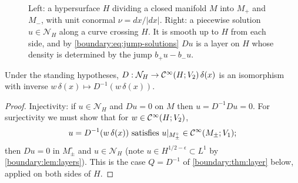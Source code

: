 \begin{figure}[ht]
  \centering
  \caption{Left: a hypersurface $H$ dividing a closed manifold $M$ into $M_+$ and
  $M_-$, with unit conormal $\nu=dx/|dx|$. Right: a piecewise solution
  $u\in\mathcal N_H$ along a curve crossing $H$. It is smooth up to $H$ from each
  side, and by \eqref{boundary:eq:jump-solutions} $Du$ is a layer on $H$ whose
  density is determined by the jump $b_+u-b_-u$.}
  \label{boundary:fig:dividing}
\end{figure}

\begin{proposition}\label{boundary:prop:layer-iso}
Under the standing hypotheses, $D:\mathcal{N}_H\to\mathcal{C}^\infty(H;V_2)\,\delta(x)$ is an
isomorphism with inverse $w\,\delta(x)\mapsto D^{-1}(w\,\delta(x))$.
\end{proposition}
\begin{proof}
Injectivity: if $u\in\mathcal{N}_H$ and $Du=0$ on $M$ then $u=D^{-1}Du=0$. For
surjectivity we must show that for $w\in\mathcal{C}^\infty(H;V_2)$,
\begin{equation}\label{boundary:eq:layer-smooth}
u=D^{-1}(w\,\delta(x))\ \text{satisfies}\ u|_{M_\pm^\circ}\in\CI(M_\pm;V_1);
\end{equation}
then $Du=0$ in $M_\pm^\circ$ and $u\in\mathcal{N}_H$ (note $u\in H^{1/2-\epsilon}
\subset L^1$ by \cref{boundary:lem:layers}). This is the case $Q=D^{-1}$ of
\cref{boundary:thm:layer} below, applied on both sides of $H$.
\end{proof}

